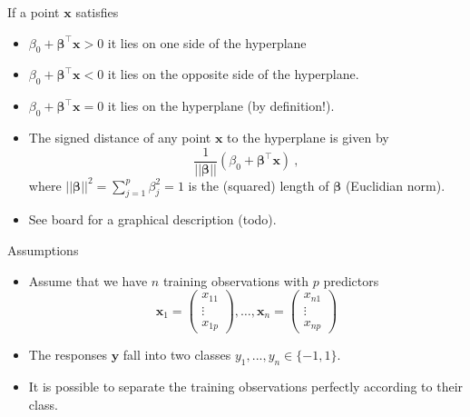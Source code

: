 \documentclass[10pt,ignorenonframetext,]{beamer}
\begin{document}
\begin{frame}

If a point \({\boldsymbol x}\) satisfies

\begin{itemize}
\item
  \(\beta_0+ {\boldsymbol \beta}^\top {\boldsymbol x}>0\) it lies on one
  side of the hyperplane
\item
  \(\beta_0+{\boldsymbol \beta}^\top {\boldsymbol x}<0\) it lies on the
  opposite side of the hyperplane.
\item
  \(\beta_0+{\boldsymbol \beta}^\top {\boldsymbol x}=0\) it lies on the
  hyperplane (by definition!).
\end{itemize}

\vspace{2mm}

\begin{itemize}
\item
  The signed distance of any point \(\boldsymbol x\) to the hyperplane
  is given by
  \[\frac{1}{||{\boldsymbol\beta}||} (\beta_0 + {\boldsymbol \beta}^\top {\boldsymbol x} )\ ,\]
  where \(||{\boldsymbol\beta}||^2 = \sum_{j=1}^p \beta_j^2=1\) is the
  (squared) length of \(\boldsymbol \beta\) (Euclidian norm).
\item
  See board for a graphical description (todo).
\end{itemize}

\end{frame}

\begin{frame}

\begin{block}{Assumptions}

\vspace{2mm}

\begin{itemize}
\item
  Assume that we have \(n\) training observations with \(p\) predictors
  \[{\boldsymbol x}_1=\left(
  \begin{array}{c}
    x_{11} \\
    \vdots \\
    x_{1p}
    \end{array}
    \right), \ldots, {\boldsymbol x}_n=\left(
  \begin{array}{c}
    x_{n1} \\
    \vdots \\
    x_{np}
    \end{array}
    \right)\]
\item
  The responses \(\boldsymbol{y}\) fall into two classes
  \(y_1,...,y_n \in \{-1,1\}\).
\item
  It is possible to separate the training observations perfectly
  according to their class.
\end{itemize}

\end{block}

\end{frame}
\end{document}
